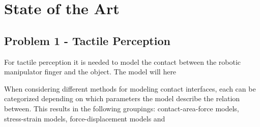 
\chapter{State of the Art} \label{ch:state-of-the-art}

\section{Problem 1 - Tactile Perception} \label{sec:lit-rev-problem-1}







For tactile perception it is needed to model the contact between the robotic manipulator finger and the object. The model will here 





%  




When considering different methods for modeling contact interfaces, each can be categorized depending on which parameters the model describe the relation between. This results in the following groupings: contact-area-force models, stress-strain models, force-displacement models and 














